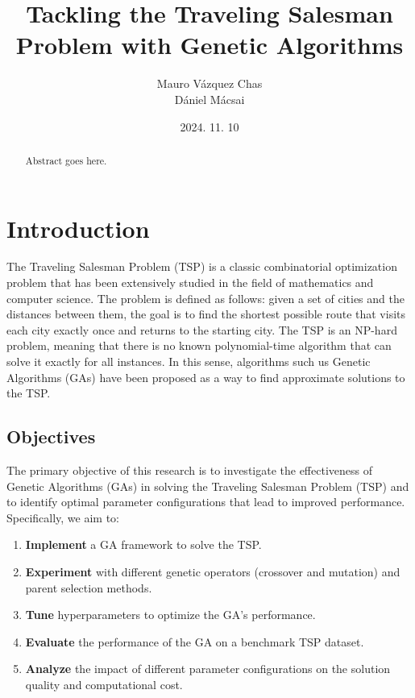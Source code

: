 \documentclass[11pt]{article}
\title{%
    \vspace{2in} %
    \textbf{Tackling the Traveling Salesman Problem with Genetic Algorithms}\\
    \vspace{2in}
}
\author{
    Mauro Vázquez Chas \\
    Dániel Mácsai
    \vspace{0.2in}
}
\date{2024. 11. 10}
\begin{document}
\maketitle
\thispagestyle{empty}

\begin{abstract}
    \noindent
    Abstract goes here.
\end{abstract}

\newpage

\tableofcontents
\newpage



\section{Introduction}
The Traveling Salesman Problem (TSP) is a classic combinatorial optimization problem that has been extensively studied in the field of mathematics and computer science. The problem is defined as follows: given a set of cities and the distances between them, the goal is to find the shortest possible route that visits each city exactly once and returns to the starting city. The TSP is an NP-hard problem, meaning that there is no known polynomial-time algorithm that can solve it exactly for all instances. In this sense, algorithms such us Genetic Algorithms (GAs) have been proposed as a way to find approximate solutions to the TSP.

\subsection{Objectives}

The primary objective of this research is to investigate the effectiveness of Genetic Algorithms (GAs) in solving the Traveling Salesman Problem (TSP) and to identify optimal parameter configurations that lead to improved performance. Specifically, we aim to:

\begin{enumerate}
    \item \textbf{Implement} a GA framework to solve the TSP.
    \item \textbf{Experiment} with different genetic operators (crossover and mutation) and parent selection methods.
    \item \textbf{Tune} hyperparameters to optimize the GA's performance.
    \item \textbf{Evaluate} the performance of the GA on a benchmark TSP dataset.
    \item \textbf{Analyze} the impact of different parameter configurations on the solution quality and computational cost.
\end{enumerate}
\end{document}
